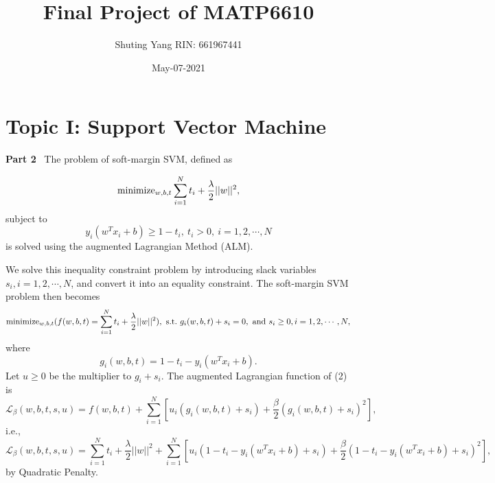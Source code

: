 \documentclass[12pt]{article}
\title{Final Project of MATP6610 }
\author{Shuting Yang RIN: 661967441}
\date{May-07-2021}
\begin{document}

\maketitle


\vspace{0.2cm}


\section*{Topic I: Support Vector Machine }

\vskip 0.3cm
\noindent
{\bf Part 2}  \ The problem of soft-margin SVM, defined as

\begin{equation}\label{e1}
{\rm minimize}_{w,b,t}\sum\limits_{i=1}^{N}t_i+\frac{\lambda}{2}||w||^2,
\end{equation}
subject to
$$
y_i(w^Tx_i+b)\geq 1-t_i, \ t_i>0, \ i=1,2,\cdots,N
$$
is solved using the augmented Lagrangian Method (ALM).

\vskip 0.2cm
\noindent
We solve this inequality constraint problem by introducing slack variables $s_i, i=1,2,\cdots,N$, and convert it into an equality constraint. The soft-margin SVM problem then becomes 
\begin{equation}\label{e2}
{\rm minimize}_{w,b,t}(f(w,b,t)=\sum\limits_{i=1}^{N}t_i+\frac{\lambda}{2}||w||^2), \ {\rm s.t.}  \ g_i(w,b,t)+s_i=0, \ {\rm and} \ s_i\geq 0, i=1,2,\cdots,N,
\end{equation}
where $$
g_i(w,b,t)=1-t_i-y_i(w^Tx_i+b).
$$
Let $u\geq 0$ be the multiplier to $g_i+s_i$. The augmented Lagrangian function of (2) is
$$
{\mathcal L}_{\beta}(w,b,t,s,u)=f(w,b,t)+\sum\limits_{i=1}^N\left[u_i(g_i(w,b,t)+s_i)+\frac{\beta}{2}(g_i(w,b,t)+s_i)^2\right],
$$
i.e.,
$$
{\mathcal L}_{\beta}(w,b,t,s,u)=\sum\limits_{i=1}^{N}t_i+\frac{\lambda}{2}||w||^2
+\sum\limits_{i=1}^N\left[u_i(1-t_i-y_i(w^Tx_i+b)+s_i)+\frac{\beta}{2}(1-t_i-y_i(w^Tx_i+b)+s_i)^2\right],
$$
by Quadratic Penalty.
\end{document}
